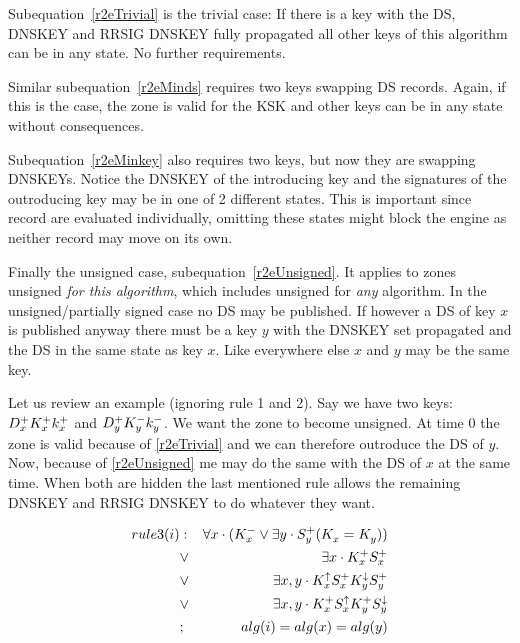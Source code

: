 \documentclass[twoside, a4paper]{article}
\begin{document}
Subequation~\eqref{r2eTrivial} is the trivial case: If there is a 
key with the DS, DNSKEY and RRSIG DNSKEY fully propagated all other 
keys of this algorithm can be in any state. No further requirements.

Similar subequation~\eqref{r2eMinds} requires two keys swapping DS 
records. Again, if this is the case, the zone is valid for the KSK 
and other keys can be in any state without consequences.

Subequation~\eqref{r2eMinkey} also requires two keys, but now they 
are swapping DNSKEYs. Notice the DNSKEY of the introducing key and 
the signatures of the outroducing key may be in one of 2 different 
states. This is important since record are evaluated individually, 
omitting these states might block the engine as neither record may 
move on its own.

Finally the unsigned case, subequation~\eqref{r2eUnsigned}. It 
applies to zones unsigned \emph{for this algorithm}, which includes 
unsigned for \emph{any} algorithm. In the unsigned/partially signed 
case no DS may be published. If however a DS of key $x$ is published 
anyway there must be a key $y$ with the DNSKEY set propagated and 
the DS in the same state as key $x$. Like everywhere else $x$ and $y$
may be the same key.

Let us review an example (ignoring rule 1 and 2). Say we have two 
keys: $D_{x}^{+}K_{x}^{+}k_{x}^{+}$ and $D_{y}^{+}K_{y}^{-}k_{y}^{-}$. We 
want the zone to become unsigned. At time 0 the zone is valid 
because of \eqref{r2eTrivial} and we can therefore outroduce the DS 
of $y$. Now, because of \eqref{r2eUnsigned} me may do the same with 
the DS of $x$ at the same time. When both are hidden the last 
mentioned rule allows the remaining DNSKEY and RRSIG DNSKEY to do 
whatever they want.

\begin{subequations}
\label{eqn:rule3Expl}
\begin{align}
rule3(i)
&:&		\forall x \cdot (K_{x}^{-} \vee \exists y \cdot S_{y}^{+} (K_{x}^{}=K_{y}^{}) ) \\
&\vee&	\exists x\cdot K_{x}^{+} S_{x}^{+} \\
&\vee&	\exists x,y\cdot K_{x}^{\uparrow} S_{x}^{+} K_{y}^{\downarrow} S_{y}^{+} \\
&\vee&	\exists x,y\cdot K_{x}^{+} S_{x}^{\uparrow} K_{y}^{+} S_{y}^{\downarrow} \\
&;&		alg(i)=alg(x)=alg(y)
\end{align}
\end{subequations}
\end{document}
